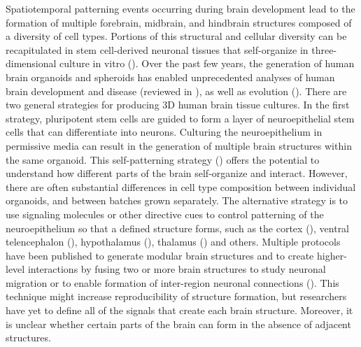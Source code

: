 Spatiotemporal patterning events occurring during brain development lead to the formation of multiple forebrain, midbrain, and hindbrain structures composed of a diversity of cell types. Portions of this structural and cellular diversity can be recapitulated in stem cell-derived neuronal tissues that self-organize in three-dimensional culture in vitro (\cite{lancaster_generation_2014}). Over the past few years, the generation of human brain organoids and spheroids has enabled unprecedented analyses of human brain development and disease (reviewed in \cite{arlotta_organoids_2018,giandomenico_probing_2017,pasca_rise_2018}), as well as evolution (\cite{kanton_organoid_2019,mora-bermudez_differences_2016,pollen_establishing_2019}). 
There are two general strategies for producing 3D human brain tissue cultures. In the first strategy, pluripotent stem cells are guided to form a layer of neuroepithelial stem cells that can differentiate into neurons. Culturing the neuroepithelium in permissive media can result in the generation of multiple brain structures within the same organoid. This self-patterning strategy (\cite{kadoshima_self-organization_2013,lancaster_cerebral_2013}) offers the potential to understand how different parts of the brain self-organize and interact. However, there are often substantial differences in cell type composition between individual organoids, and between batches grown separately. The alternative strategy is to use signaling molecules or other directive cues to control patterning of the neuroepithelium so that a defined structure forms, such as the cortex (\cite{eiraku_self-organized_2008,kadoshima_self-organization_2013,birey_assembly_2017}), ventral telencephalon (\cite{bagley_fused_2017,birey_assembly_2017,xiang_fusion_2017}), hypothalamus (\cite{qian_brain-region-specific_2016}), thalamus (\cite{xiang_hesc-derived_2019}) and others. Multiple protocols have been published to generate modular brain structures and to create higher-level interactions by fusing two or more brain structures to study neuronal migration or to enable formation of inter-region neuronal connections (\cite{bagley_fused_2017,birey_assembly_2017,duan_model-based_2019,pasca_rise_2018}). This technique might increase reproducibility of structure formation, but researchers have yet to define all of the signals that create each brain structure. Moreover, it is unclear whether certain parts of the brain can form in the absence of adjacent structures. 

